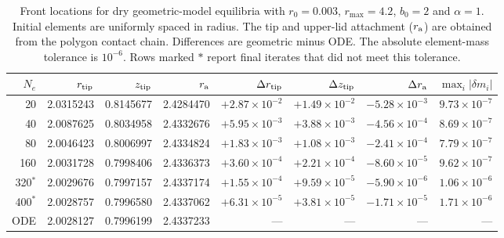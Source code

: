 \begin{table}
\centering
\small
\setlength{\tabcolsep}{4pt}
\begin{tabular}{r r r r r r r r}
\hline
$N_e$ & $r_{\rm tip}$ & $z_{\rm tip}$ & $r_{\rm a}$ & $\Delta r_{\rm tip}$ & $\Delta z_{\rm tip}$ & $\Delta r_{\rm a}$ & $\max_i|\delta m_i|$ \\
\hline
20 & 2.0315243 & 0.8145677 & 2.4284470 & $+2.87\times10^{-2}$ & $+1.49\times10^{-2}$ & $-5.28\times10^{-3}$ & $9.73\times10^{-7}$ \\
40 & 2.0087625 & 0.8034958 & 2.4332676 & $+5.95\times10^{-3}$ & $+3.88\times10^{-3}$ & $-4.56\times10^{-4}$ & $8.69\times10^{-7}$ \\
80 & 2.0046423 & 0.8006997 & 2.4334824 & $+1.83\times10^{-3}$ & $+1.08\times10^{-3}$ & $-2.41\times10^{-4}$ & $7.79\times10^{-7}$ \\
160 & 2.0031728 & 0.7998406 & 2.4336373 & $+3.60\times10^{-4}$ & $+2.21\times10^{-4}$ & $-8.60\times10^{-5}$ & $9.62\times10^{-7}$ \\
320$^{\ast}$ & 2.0029676 & 0.7997157 & 2.4337174 & $+1.55\times10^{-4}$ & $+9.59\times10^{-5}$ & $-5.90\times10^{-6}$ & $1.06\times10^{-6}$ \\
400$^{\ast}$ & 2.0028757 & 0.7996580 & 2.4337062 & $+6.31\times10^{-5}$ & $+3.81\times10^{-5}$ & $-1.71\times10^{-5}$ & $1.71\times10^{-6}$ \\
\hline
ODE & 2.0028127 & 0.7996199 & 2.4337233 & --- & --- & --- & --- \\
\hline
\end{tabular}
\caption{Front locations for dry geometric-model equilibria with $r_0=0.003$, $r_{\max}=4.2$, $b_0=2$ and $\alpha=1$. Initial elements are uniformly spaced in radius. The tip and upper-lid attachment ($r_{\rm a}$) are obtained from the polygon contact chain. Differences are geometric minus ODE. The absolute element-mass tolerance is $10^{-6}$. Rows marked $\ast$ report final iterates that did not meet this tolerance.}
\label{tab:geometric-front-convergence}
\end{table}
